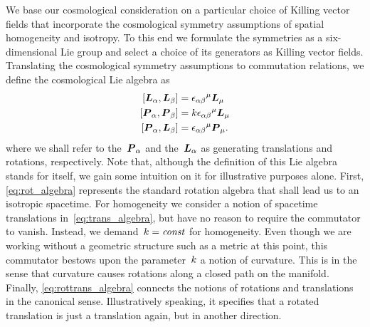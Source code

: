 We base our cosmological consideration on a particular choice of Killing vector fields that incorporate the cosmological symmetry assumptions of spatial homogeneity and isotropy. To this end we formulate the symmetries as a six-dimensional Lie group and select a choice of its generators as Killing vector fields. Translating the cosmological symmetry assumptions to commutation relations, we define the cosmological Lie algebra as
\begin{subequations}\label{eq:cosmo_algebra}
\begin{align}
	\comm{\vect{\Lvec}_\alpha}{\vect{\Lvec}_\beta}&={\levciv_{\alpha\beta}}^\mu\vect{\Lvec}_\mu \label{eq:rot_algebra}\\
	\comm{\vect{\Pvec}_\alpha}{\vect{\Pvec}_\beta}&=\spatcurv{\levciv_{\alpha\beta}}^\mu\vect{\Lvec}_\mu \label{eq:trans_algebra}\\
	\comm{\vect{\Pvec}_\alpha}{\vect{\Lvec}_\beta}&={\levciv_{\alpha\beta}}^\mu\vect{\Pvec}_\mu \label{eq:rottrans_algebra}
	\eqpunct{.}
\end{align}
\end{subequations}
where we shall refer to the~$\boldsymbol{P}_\alpha$ and the~$\boldsymbol{L}_\alpha$ as generating translations and rotations, respectively. Note that, although the definition of this Lie algebra stands for itself, we gain some intuition on it for illustrative purposes alone. First, \eqref{eq:rot_algebra} represents the standard rotation algebra that shall lead us to an isotropic spacetime. For homogeneity we consider a notion of spacetime translations in~\eqref{eq:trans_algebra}, but have no reason to require the commutator to vanish. Instead, we demand~$k=\textnormal{\textit{const}}$ for homogeneity. Even though we are working without a geometric structure such as a metric at this point, this commutator bestows upon the parameter~$k$ a notion of curvature. This is in the sense that curvature causes rotations along a closed path on the manifold. Finally, \eqref{eq:rottrans_algebra} connects the notions of rotations and translations in the canonical sense. Illustratively speaking, it specifies that a rotated translation is just a translation again, but in another direction.

